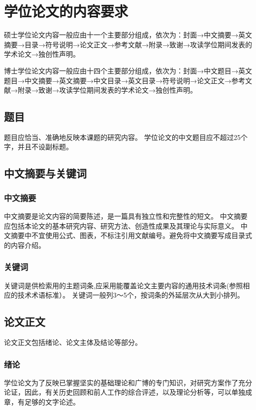 \section{学位论文的内容要求}

硕士学位论文内容一般应由十一个主要部分组成，依次为：封面→中文摘要→英文摘要→目录→符号说明→论文正文→参考文献→附录→致谢→攻读学位期间发表的学术论文→独创性声明。

博士学位论文内容一般应由十四个主要部分组成，依次为：封面→中文题目→英文题目→中文摘要→英文摘要→中文目录→英文目录→符号说明→论文正文→参考文献→附录→致谢→攻读学位期间发表的学术论文→独创性声明。

\subsection{题目}
题目应恰当、准确地反映本课题的研究内容。
学位论文的中文题目应不超过25个字，并且不设副标题。

\subsection{中文摘要与关键词}

\subsubsection{中文摘要}
中文摘要是论文内容的简要陈述，是一篇具有独立性和完整性的短文。
中文摘要应包括本论文的基本研究内容、研究方法、创造性成果及其理论与实际意义。
中文摘要中不宜使用公式、图表，不标注引用文献编号。避免将中文摘要写成目录式的内容介绍。

\subsubsection{关键词}
关键词是供检索用的主题词条,应采用能覆盖论文主要内容的通用技术词条(参照相应的技术术语标准）。
关键词一般列3～5个，按词条的外延层次从大到小排列。

\subsection{论文正文}
论文正文包括绪论、论文主体及结论等部分。

\subsubsection{绪论}
学位论文为了反映已掌握坚实的基础理论和广博的专门知识，对研究方案作了充分论证，因此，有关历史回顾和前人工作的综合评述，以及理论分析等，可以单独成章，有足够的文字论述。

